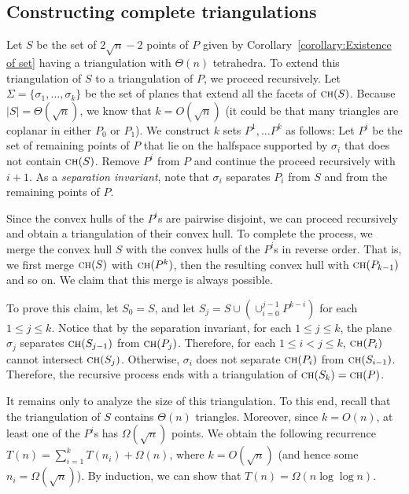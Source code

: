 \documentclass[a4paper, 11pt]{article}
\newcommand{\ch}[1]{\ensuremath{\textsc{ch}(#1)}}
\begin{document}
\subsection{Constructing complete triangulations}
Let $S$ be the set of $2\sqrt{n}-2$ points of $P$ given by Corollary~\ref{corollary:Existence of set} having a triangulation with $\Theta(n)$ tetrahedra.
To extend this triangulation of $S$ to a triangulation of $P$, we proceed recursively. Let $\Sigma = \{\sigma_1, \ldots, \sigma_k\}$ be the set of planes that extend all the facets of $\ch{S}$. Because $|S| = \Theta(\sqrt{n})$, we know that $k =  O(\sqrt{n})$ (it could be that many triangles are coplanar in either $P_0$ or $P_1$).
We construct $k$ sets $P^1, \ldots P^k$ as follows: 
Let $P^i$ be the set of remaining points of $P$ that lie on the halfspace supported by $\sigma_i$ that does not contain $\ch{S}$.
Remove $P^i$ from $P$ and continue the proceed recursively with~$i+1$.
As a \emph{separation invariant}, note that $\sigma_i$ separates $P_i$ from $S$ and from the remaining points of $P$.

Since the convex hulls of the $P^i$s are pairwise disjoint, we can proceed recursively and obtain a triangulation of their convex hull. 
To complete the process, we merge the convex hull $S$ with the convex hulls of the $P^i$s in reverse order. 
That is, we first merge $\ch{S}$ with $\ch{P^k}$, then the resulting convex hull with $\ch{P_{k-1}}$ and so on. 
We claim that this merge is always possible. 

To prove this claim, let $S_0 = S$, and let $S_j = S\cup (\cup_{i=0}^{j -1} P^{k-i})$ for each $1\leq j\leq k$. 
Notice that by the separation invariant, for each $1\leq  j \leq k$, the plane $\sigma_j$ separates $\ch{S_{j-1}}$ from $\ch{P_j}$.
Therefore, for each $1\leq i < j \leq k$, $\ch{P_i}$ cannot intersect $\ch{S_j}$. Otherwise, $\sigma_i$ does not separate $\ch{P_i}$ from $\ch{S_{i-1}}$. Therefore, the recursive process ends with a triangulation of $\ch{S_k} = \ch{P}$.

It remains only to analyze the size of this triangulation. To this end, recall that the triangulation of $S$ contains $\Theta(n)$ triangles.
Moreover, since $k = O(n)$, at least one of the $P^i$s has $\Omega(\sqrt{n})$ points.
We obtain the following recurrence $T(n) = \sum_{i=1}^k T(n_i) + \Omega(n)$, where $k = O(\sqrt{n})$ (and hence some $n_i = \Omega (\sqrt{n})$). 
By induction, we can show that $T(n) = \Omega(n\log\log n)$.
\end{document}
